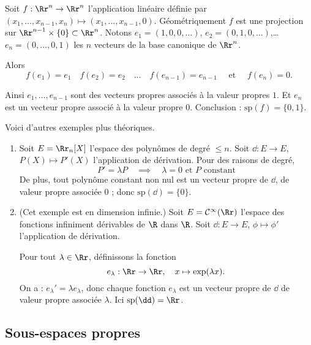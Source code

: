 \documentclass[12pt, class=report,crop=false]{standalone}
\newcommand{\Sp}{\text{sp}}
\begin{document}
\begin{exemple}
\label{ex:diagon2}
Soit $f : \Rr^n \to \Rr^n$ l'application linéaire définie
par $(x_1,\ldots,x_{n-1},x_n) \mapsto (x_1,\ldots,x_{n-1},0)$.
Géométriquement $f$ est une projection sur $\Rr^{n-1}\times \{0\} \subset \Rr^n$.
Notons $e_1 = (1,0,0,\ldots)$, $e_2 = (0,1,0,\ldots)$,\ldots $e_n = (0,\ldots,0,1)$ les $n$
vecteurs de la base canonique de $\Rr^n$.

Alors
$$f(e_1)=e_1 \quad f(e_2)=e_2 \quad \ldots \quad f(e_{n-1})=e_{n-1} \quad \text { et } \quad f(e_n)= 0.$$

Ainsi $e_1,\ldots,e_{n-1}$ sont des vecteurs propres associés à la valeur propres $1$.
Et $e_n$ est un vecteur propre associé à la valeur propre $0$. Conclusion : $\Sp(f) = \{0,1\}$.
\end{exemple}


Voici d'autres exemples plus théoriques.

\begin{exemple}
\sauteligne
\begin{enumerate}

  \item Soit $E=\Rr_{n}[X]$ l'espace des polynômes de degré $\le n$. Soit $\dd : E \to E$, $P(X) \mapsto P'(X)$
  l'application de dérivation. 
Pour des raisons de degré, 
\[P' =\lambda P \quad \implies \quad \lambda =0 \text{ et } P \mbox{ constant}\]
De plus, tout polynôme constant non nul est un vecteur propre de $\dd$, de valeur propre associée $0$ ; donc 
$\Sp(\dd) = \{0\}$.

  \item (Cet exemple est en dimension infinie.)
   Soit $E =\mathcal{C}^\infty(\Rr)$ l'espace des fonctions infiniment dérivables de $\R$ dans $\R$. Soit 
   $\dd : E \to E$, $\phi \mapsto \phi'$ l'application de dérivation.

Pour tout $\lambda \in \Rr$, définissons la fonction 
\[e_\lambda : \Rr \to \Rr, \quad x \mapsto \exp(\lambda x).\]
On a : $e_\lambda' = \lambda e_\lambda$, donc chaque fonction $e_\lambda$ est un vecteur propre de $\dd$ de valeur propre associée $\lambda$. Ici $\Sp(\dd) = \Rr$.
\end{enumerate}
\end{exemple}




\subsection{Sous-espaces propres}
\end{document}
